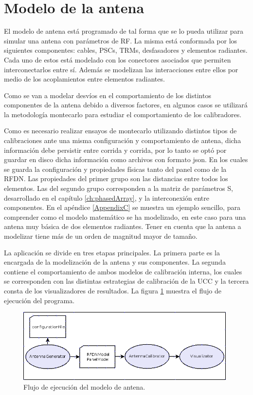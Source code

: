 \section{Modelo de la antena}

El modelo de antena está programado de tal forma que se lo pueda utilizar para simular una antena con parámetros de RF. La
misma está conformada por los siguientes componentes: cables, PSCs, TRMs, desfasadores y elementos radiantes. Cada uno de estos
está modelado con los conectores asociados que permiten interconectarlos entre sí. Además se modelizan las interacciones entre
ellos por medio de los acoplamientos entre elementos radiantes. 

Como se van a modelar desvíos en el comportamiento de los distintos componentes de la antena debido a diversos factores, en
algunos casos se utilizará la metodología montecarlo para estudiar el comportamiento de los calibradores.

Como es necesario realizar ensayos de montecarlo utilizando distintos tipos de calibraciones ante una misma configuración y 
comportamiento de antena, dicha información debe persistir entre corrida y corrida, por lo tanto se optó por guardar en disco
dicha información como archivos con formato json. En los cuales se guarda la configuración y propiedades físicas tanto del
panel como de la RFDN. Las propiedades del primer grupo son las distancias entre todos los elementos. Las del segundo grupo
corresponden a la matriz de parámetros S, desarrollado en el capítulo \ref{ch:phasedArray}, y la interconexión entre
componentes. En el apéndice \ref{AppendixC} se muestra un ejemplo sencillo, para comprender como el modelo
matemático se ha modelizado, en este caso para una antena muy básica de dos elementos radiantes. Tener en cuenta que la antena
a modelizar tiene más de un orden de magnitud mayor de tamaño.

La aplicación se divide en tres etapas principales. La primera parte es la encargada de la modelización de la antena y sus
componentes. La segunda contiene el comportamiento de ambos modelos de calibración interna, los cuales se corresponden con las
distintas estrategias de calibración de la UCC y la tercera consta de los visualizadores de resultados. La figura
\ref{fig:prog_inic} muestra el flujo de ejecución del programa.

\begin{figure}
 \centering
 \includegraphics[width=11cm]{gfx/FlujoEjecucion.png}
 \caption{Flujo de ejecuci\'on del modelo de antena.}
 \label{fig:prog_inic}
\end{figure}

